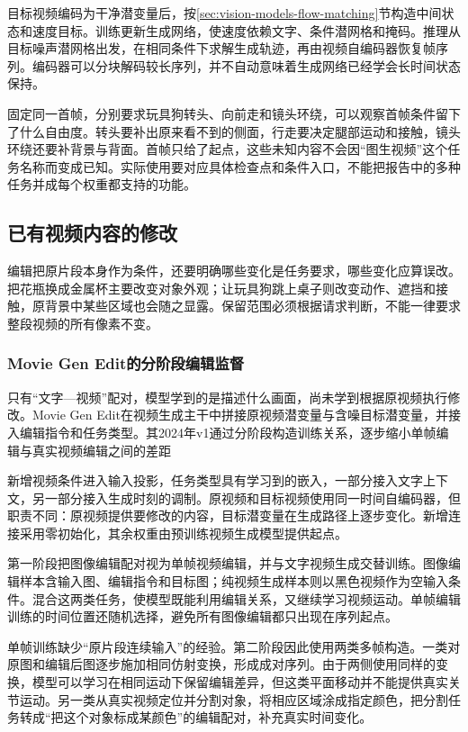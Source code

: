 目标视频编码为干净潜变量后，按\ref{sec:vision-models-flow-matching}节构造中间状态和速度目标。训练更新生成网络，使速度依赖文字、条件潜网格和掩码。推理从目标噪声潜网格出发，在相同条件下求解生成轨迹，再由视频自编码器恢复帧序列。编码器可以分块解码较长序列，并不自动意味着生成网络已经学会长时间状态保持。

固定同一首帧，分别要求玩具狗转头、向前走和镜头环绕，可以观察首帧条件留下了什么自由度。转头要补出原来看不到的侧面，行走要决定腿部运动和接触，镜头环绕还要补背景与背面。首帧只给了起点，这些未知内容不会因“图生视频”这个任务名称而变成已知。实际使用要对应具体检查点和条件入口，不能把报告中的多种任务并成每个权重都支持的功能。

\subsection{已有视频内容的修改}
\label{sec:vision-multigen-edit-video}

编辑把原片段本身作为条件，还要明确哪些变化是任务要求，哪些变化应算误改。把花瓶换成金属杯主要改变对象外观；让玩具狗跳上桌子则改变动作、遮挡和接触，原背景中某些区域也会随之显露。保留范围必须根据请求判断，不能一律要求整段视频的所有像素不变。

\Needspace{165mm}
\subsubsection{Movie Gen Edit的分阶段编辑监督}
\label{sec:vision-multigen-movie-edit}

只有“文字—视频”配对，模型学到的是描述什么画面，尚未学到根据原视频执行修改。Movie Gen Edit在视频生成主干中拼接原视频潜变量与含噪目标潜变量，并接入编辑指令和任务类型。其2024年v1通过分阶段构造训练关系，逐步缩小单帧编辑与真实视频编辑之间的差距

新增视频条件进入输入投影，任务类型具有学习到的嵌入，一部分接入文字上下文，另一部分接入生成时刻的调制。原视频和目标视频使用同一时间自编码器，但职责不同：原视频提供要修改的内容，目标潜变量在生成路径上逐步变化。新增连接采用零初始化，其余权重由预训练视频生成模型提供起点。

第一阶段把图像编辑配对视为单帧视频编辑，并与文字视频生成交替训练。图像编辑样本含输入图、编辑指令和目标图；纯视频生成样本则以黑色视频作为空输入条件。混合这两类任务，使模型既能利用编辑关系，又继续学习视频运动。单帧编辑训练的时间位置还随机选择，避免所有图像编辑都只出现在序列起点。

单帧训练缺少“原片段连续输入”的经验。第二阶段因此使用两类多帧构造。一类对原图和编辑后图逐步施加相同仿射变换，形成成对序列。由于两侧使用同样的变换，模型可以学习在相同运动下保留编辑差异，但这类平面移动并不能提供真实关节运动。另一类从真实视频定位并分割对象，将相应区域涂成指定颜色，把分割任务转成“把这个对象标成某颜色”的编辑配对，补充真实时间变化。

